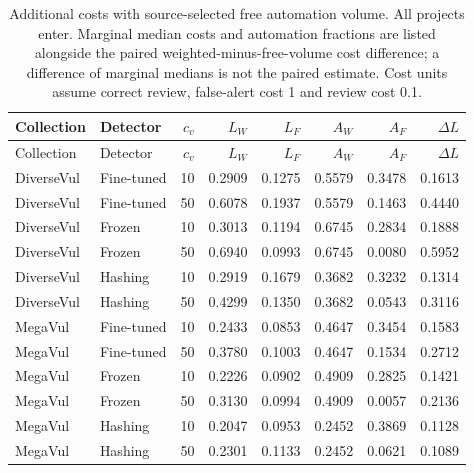 \begin{longtable}{@{}llrrrrrr@{}}
\caption{Additional costs with source-selected free automation volume. All projects enter. Marginal median costs and automation fractions are listed alongside the paired weighted-minus-free-volume cost difference; a difference of marginal medians is not the paired estimate. Cost units assume correct review, false-alert cost 1 and review cost 0.1.}\label{si:newcosts}\\
\toprule Collection & Detector & $c_v$ & $L_W$ & $L_F$ & $A_W$ & $A_F$ & $\Delta L$\\\midrule\endfirsthead
\toprule Collection & Detector & $c_v$ & $L_W$ & $L_F$ & $A_W$ & $A_F$ & $\Delta L$\\\midrule\endhead
\bottomrule\endfoot
DiverseVul & Fine-tuned & 10 & 0.2909 & 0.1275 & 0.5579 & 0.3478 & 0.1613\\
DiverseVul & Fine-tuned & 50 & 0.6078 & 0.1937 & 0.5579 & 0.1463 & 0.4440\\
DiverseVul & Frozen & 10 & 0.3013 & 0.1194 & 0.6745 & 0.2834 & 0.1888\\
DiverseVul & Frozen & 50 & 0.6940 & 0.0993 & 0.6745 & 0.0080 & 0.5952\\
DiverseVul & Hashing & 10 & 0.2919 & 0.1679 & 0.3682 & 0.3232 & 0.1314\\
DiverseVul & Hashing & 50 & 0.4299 & 0.1350 & 0.3682 & 0.0543 & 0.3116\\
MegaVul & Fine-tuned & 10 & 0.2433 & 0.0853 & 0.4647 & 0.3454 & 0.1583\\
MegaVul & Fine-tuned & 50 & 0.3780 & 0.1003 & 0.4647 & 0.1534 & 0.2712\\
MegaVul & Frozen & 10 & 0.2226 & 0.0902 & 0.4909 & 0.2825 & 0.1421\\
MegaVul & Frozen & 50 & 0.3130 & 0.0994 & 0.4909 & 0.0057 & 0.2136\\
MegaVul & Hashing & 10 & 0.2047 & 0.0953 & 0.2452 & 0.3869 & 0.1128\\
MegaVul & Hashing & 50 & 0.2301 & 0.1133 & 0.2452 & 0.0621 & 0.1089\\
\end{longtable}
